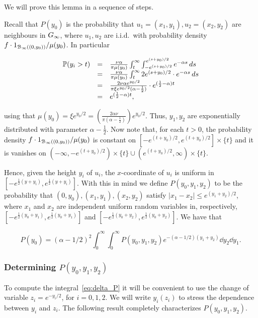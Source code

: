We will prove this lemma in a sequence of steps.

Recall that $P(y_0)$ is the probability that $u_1 = (x_1,y_1), u_2 = (x_2,y_2)$ are neighbours in $G_{\infty}$, where
$u_1, u_2$ are i.i.d.~with probability density $f \cdot 1_{{\mathcal B}_{\infty}\left((0,y_0)\right)} / \mu(y_0)$.
In particular

$$ \begin{array}{rcl} 
\mathbb{P}( y_i > t ) 
& = & 
\frac{\nu\alpha}{\pi \mu(y_0)} \int_t^\infty \int_{-e^{(s+y_0)/2}}^{e^{(s+y_0)/2}} e^{-\alpha s}\, d s \\
& = & 
\frac{\nu\alpha}{\pi \mu(y_0)} \int_t^\infty 2 e^{(s+y_0)/2} \cdot e^{-\alpha s}\, d s \\
& = & 
\frac{2 \nu\alpha e^{y_0/2} }{\pi \xi e^{y_0/2} (\alpha-\frac12) }  \cdot e^{(\frac12-\alpha)t} \\
& = & 
 e^{(\frac12-\alpha)t},
\end{array} $$

\noindent
using that $\mu(y_0) = \xi e^{y_0/2} = \left(\frac{2\alpha\nu}{\pi(\alpha-\frac12)}\right) e^{y_0/2}$.
Thus, $y_1, y_2$ are exponentially distributed with parameter $\alpha-\frac12$.
Now note that, for each $t>0$, the probability density $f \cdot 1_{{\mathcal B}_{\infty}\left((0,y_0)\right)} / \mu(y_0)$
is constant on $[-e^{(t+y_0)/2}, e^{(t+y_0)/2}] \times \{t\}$ and it is 
vanishes on $(-\infty, -e^{(t+y_0)/2}) \times \{t\} \cup (e^{(t+y_0)/2},\infty)\times\{t\}$.

Hence, given the height $y_i$ of $u_i$, the $x$-coordinate of $u_i$ is uniform in $[-e^{\frac{1}{2}(y+y_i)},e^{\frac{1}{2}(y+y_i)}]$. 
With this in mind we define $P(y_0,y_1,y_2)$ to be the probability that $(0,y_0), (x_1,y_1), (x_2,y_2)$ 
satisfy $|x_1-x_2| \leq e^{(y_1+y_2)/2}$, where $x_1$ and $x_2$ are independent uniform random variables in, respectively, 
$[-e^{\frac{1}{2}(y_0+y_1)},e^{\frac{1}{2}(y_0+y_1)}]$ and  $[-e^{\frac{1}{2}(y_0+y_2)},e^{\frac{1}{2}(y_0+y_2)}]$.
We have that

\begin{equation}\label{eq:delta_P}
 P(y_0) = (\alpha-1/2)^2 \int_0^\infty \int_0^\infty P(y_0, y_1, y_2) e^{-(\alpha-1/2)(y_1+y_2)} 
 \dd y_2 \dd y_1.
\end{equation}

\subsubsection{Determining $P(y_0,y_1,y_2)$}


To compute the integral~\eqref{eq:delta_P} it will be convenient to use the 
change of variable $z_i = e^{-y_i/2}$, for $i= 0, 1, 2$. 
We will write $y_i(z_i)$ to stress the dependence between $y_i$ and $z_i$. 
The following result completely characterizes $P(y_0,y_1,y_2)$.

